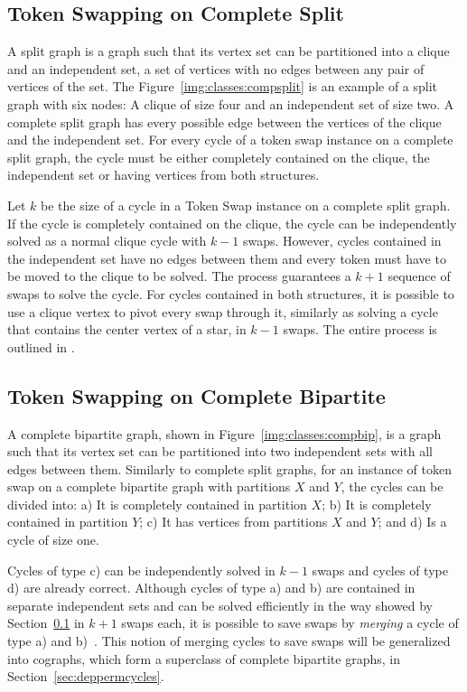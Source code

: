 \documentclass[msc,english,table,xcdraw]{ppgccufmg}
\begin{document}
\subsection{Token Swapping on Complete Split}
\label{sec:intro:classes_uppers:compsplit}

A split graph is a graph such that its vertex set can be partitioned into
a clique and an independent set, a set of vertices with no edges between any
pair of vertices of the set.
The Figure~\ref{img:classes:compsplit} is an example of a split graph with six
nodes: A clique of size four and an independent set of size two.
A complete split graph has every possible edge between the vertices of the
clique and the independent set.
For every cycle of a token swap instance on a complete split graph, the cycle
must be either completely contained on the clique, the independent set or
having vertices from both structures.

Let $k$ be the size of a cycle in a Token Swap instance  on a complete split
graph.
If the cycle is completely contained on the clique, the cycle can be independently
solved as a normal clique cycle with $k -1$ swaps.
However, cycles contained in the independent set have no edges between them
and every token must have to be moved to the clique to be solved.
The process guarantees a $k + 1$ sequence of swaps to solve the cycle.
For cycles contained in both structures, it is possible to use a clique vertex
to pivot every swap through it, similarly as solving a cycle that contains the
center vertex of a star, in $k - 1$ swaps.
The entire process is outlined in \cite{Yasui:2015}.

\subsection{Token Swapping on Complete Bipartite}

A complete bipartite graph, shown in Figure~\ref{img:classes:compbip}, 
is a graph such that its vertex set can be partitioned into two independent sets
with all edges between them.
Similarly to complete split graphs, for an instance of token swap on a complete
bipartite graph with partitions $X$ and $Y$, the cycles can be divided into: 
a) It is completely contained in partition $X$; b) It is completely contained
in partition $Y$; c) It has vertices from partitions $X$ and $Y$; and d) Is a
cycle of size one.

Cycles of type c) can be independently solved in $k - 1$ swaps and cycles of
type d) are already correct.
Although cycles of type a) and b) are contained in separate independent sets
and can be solved efficiently in the way showed by Section~\ref{sec:intro:classes_uppers:compsplit} 
in $k + 1$ swaps each, it is possible to save swaps by \textit{merging} a cycle
of type a) and b)~\citep{Yamanaka:2015}.
This notion of merging cycles to save swaps will be generalized into cographs,
which form a superclass of complete bipartite graphs, in Section~\ref{sec:deppermcycles}.
\end{document}
